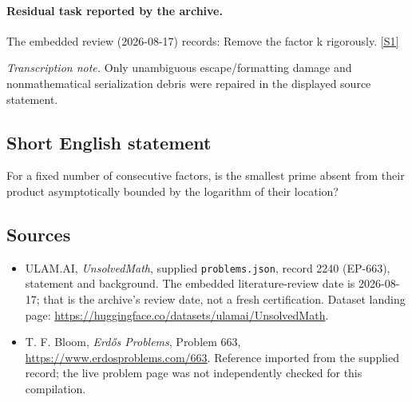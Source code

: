 \documentclass[11pt,a4paper]{article}
\newcommand{\sref}[2]{\hyperlink{source:#1:#2}{[S#2]}}
\begin{document}
\paragraph{Residual task reported by the archive.}

The embedded review (2026-08-17) records: Remove the factor k rigorously. \sref{2240}{1}

{\small\emph{Transcription note.} Only unambiguous escape/formatting damage and nonmathematical serialization debris were repaired in the displayed source statement.}

\subsection{Short English statement}

For a fixed number of consecutive factors, is the smallest prime absent from their product asymptotically bounded by the logarithm of their location?

\subsection{Sources}

{\small

\begin{itemize}

\item[\hypertarget{source:2240:1}{S1}] ULAM.AI, \emph{UnsolvedMath}, supplied \texttt{problems.json}, record 2240 (EP-663), statement and background. The embedded literature-review date is 2026-08-17; that is the archive’s review date, not a fresh certification. Dataset landing page: \url{https://huggingface.co/datasets/ulamai/UnsolvedMath}.

\item[\hypertarget{source:2240:2}{S2}] T. F. Bloom, \emph{Erdős Problems}, Problem 663, \url{https://www.erdosproblems.com/663}. Reference imported from the supplied record; the live problem page was not independently checked for this compilation.

\end{itemize}

}

\label{end:2240}
\end{document}
